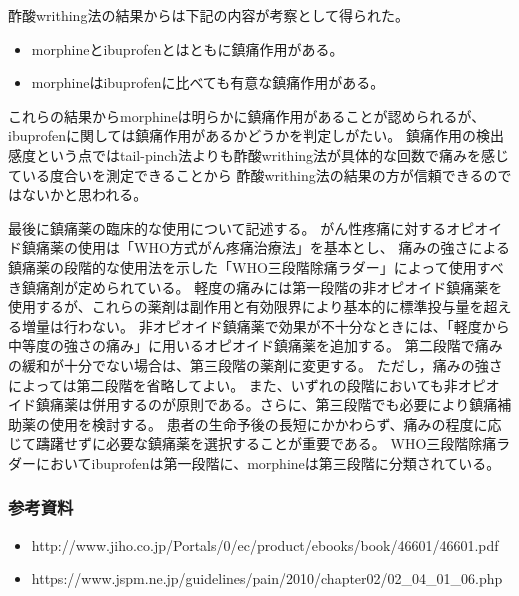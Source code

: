 \documentclass[a4paper,papersize,dvipdfmx]{jsarticle}
\begin{document}
酢酸writhing法の結果からは下記の内容が考察として得られた。
\begin{itemize}
\item morphineとibuprofenとはともに鎮痛作用がある。
\item morphineはibuprofenに比べても有意な鎮痛作用がある。
\end{itemize}

これらの結果からmorphineは明らかに鎮痛作用があることが認められるが、
ibuprofenに関しては鎮痛作用があるかどうかを判定しがたい。
鎮痛作用の検出感度という点ではtail-pinch法よりも酢酸writhing法が具体的な回数で痛みを感じている度合いを測定できることから
酢酸writhing法の結果の方が信頼できるのではないかと思われる。

最後に鎮痛薬の臨床的な使用について記述する。
がん性疼痛に対するオピオイド鎮痛薬の使用は「WHO方式がん疼痛治療法」を基本とし、
痛みの強さによる鎮痛薬の段階的な使用法を示した「WHO三段階除痛ラダー」によって使用すべき鎮痛剤が定められている。
軽度の痛みには第一段階の非オピオイド鎮痛薬を使用するが、これらの薬剤は副作用と有効限界により基本的に標準投与量を超える増量は行わない。
非オピオイド鎮痛薬で効果が不十分なときには、「軽度から中等度の強さの痛み」に用いるオピオイド鎮痛薬を追加する。
第二段階で痛みの緩和が十分でない場合は、第三段階の薬剤に変更する。
ただし，痛みの強さによっては第二段階を省略してよい。
また、いずれの段階においても非オピオイド鎮痛薬は併用するのが原則である。さらに、第三段階でも必要により鎮痛補助薬の使用を検討する。
患者の生命予後の長短にかかわらず、痛みの程度に応じて躊躇せずに必要な鎮痛薬を選択することが重要である。
WHO三段階除痛ラダーにおいてibuprofenは第一段階に、morphineは第三段階に分類されている。

\subsubsection*{参考資料}
\footnotesize
\begin{itemize}
  \item http://www.jiho.co.jp/Portals/0/ec/product/ebooks/book/46601/46601.pdf
  \item https://www.jspm.ne.jp/guidelines/pain/2010/chapter02/02\_04\_01\_06.php
\end{itemize}
\end{document}
